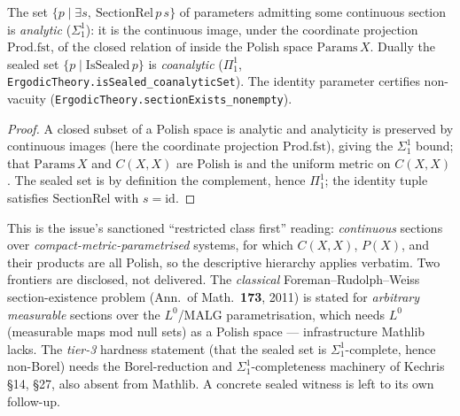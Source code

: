 \begin{theorem}\label{thm:dst-section-analytic}
  \leanok
  The set \(\{p \mid \exists s,\ \mathrm{SectionRel}\,p\,s\}\) of parameters admitting some continuous
  section is \emph{analytic} (\(\Sigma^1_1\)): it is the continuous image, under the coordinate
  projection \(\mathrm{Prod.fst}\), of the closed relation of  inside
  the Polish space \(\mathrm{Params}\,X\). Dually the sealed set \(\{p \mid \mathrm{IsSealed}\,p\}\) is
  \emph{coanalytic} (\(\Pi^1_1\), \texttt{ErgodicTheory.isSealed\_coanalyticSet}). The identity
  parameter certifies non-vacuity (\texttt{ErgodicTheory.sectionExists\_nonempty}).
\end{theorem}
\begin{proof}\leanok
  A closed subset of a Polish space is analytic and analyticity is preserved by continuous images
  (here the coordinate projection \(\mathrm{Prod.fst}\)), giving the \(\Sigma^1_1\) bound; that
  \(\mathrm{Params}\,X\) and \(C(X,X)\) are Polish is  and the uniform
  metric on \(C(X,X)\). The sealed set is by definition the complement, hence \(\Pi^1_1\); the
  identity tuple satisfies \(\mathrm{SectionRel}\) with \(s = \mathrm{id}\).
\end{proof}

\begin{remark}\label{thm:dst-section-scope}
  This is the issue's sanctioned ``restricted class first'' reading: \emph{continuous} sections over
  \emph{compact-metric-parametrised} systems, for which \(C(X,X)\), \(P(X)\), and their products are
  all Polish, so the descriptive hierarchy applies verbatim. Two frontiers are disclosed, not
  delivered. The \emph{classical} Foreman--Rudolph--Weiss section-existence problem (Ann.\ of Math.\
  \textbf{173}, 2011) is stated for \emph{arbitrary measurable} sections over the \(L^0\)/MALG
  parametrisation, which needs \(L^0\) (measurable maps mod null sets) as a Polish space ---
  infrastructure Mathlib lacks. The \emph{tier-3} hardness statement (that the sealed set is
  \(\Sigma^1_1\)-complete, hence non-Borel) needs the Borel-reduction and \(\Sigma^1_1\)-completeness
  machinery of Kechris \S14, \S27, also absent from Mathlib. A concrete sealed witness is left to its
  own follow-up.
\end{remark}

